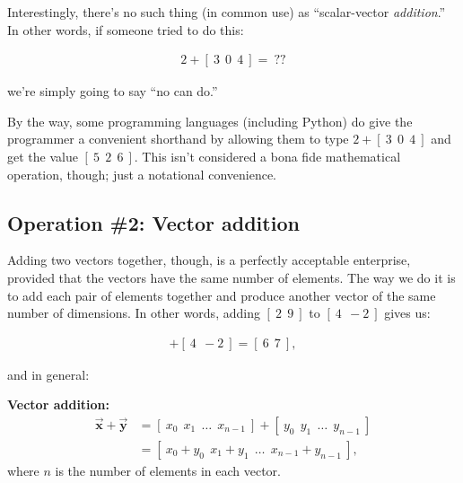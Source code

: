 Interestingly, there's no such thing (in common use) as ``scalar-vector
\textit{addition}.'' In other words, if someone tried to do this:

\vspace{-.15in}
\begin{align*}
2 + [\ 3\ \ 0\ \ 4\ ] = \ ??
\end{align*}
\vspace{-.15in}

we're simply going to say ``no can do.''

By the way, some programming languages (including Python) do give the
programmer a convenient shorthand by allowing them to type
$2 + [\ 3\ \ 0\ \ 4\ ]$ and get the value $[\ 5\ \ 2\ \ 6\ ]$. This isn't
considered a bona fide mathematical operation, though; just a notational
convenience.

\subsection{Operation \#2: Vector addition}

Adding two vectors together, though, is a perfectly acceptable enterprise,
provided that the vectors have the same number of elements. The way we do it is
to add each pair of elements together and produce another vector of the same
number of dimensions. In other words, adding $[\ 2\ \ 9\ ]$ to $[\ 4\ \ -2\ ]$
gives us:

\vspace{-.15in}
\begin{align*}
[\ 2\ \ 9\ ] + [\ 4\ \ -2\ ] = [\ 6\ \ 7\ ],
\end{align*}
\vspace{-.15in}

and in general:

\vspace{-.15in}
\begin{center}
\begin{framed}
\textbf{Vector addition:}
\begin{align*}
\overrightarrow{\textbf{x}} + \overrightarrow{\textbf{y}} &=
[\ x_0\ \ x_1\ \ \dots \ \ x_{n-1}\ ] +
[\ y_0\ \ y_1\ \ \dots \ \ y_{n-1}\ ] \\
&= [\ x_0 + y_0\ \ x_1 + y_1\ \ \dots \ \ x_{n-1} + y_{n-1}\ ],
\end{align*}
where $n$ is the number of elements in each vector.
\end{framed}
\end{center}
\vspace{-.15in}

